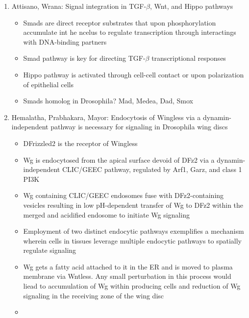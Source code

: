 \documentclass[12pt]{article}
\begin{document}
\begin{enumerate}
\item Attisano, Wrana: Signal integration in TGF-$\beta$, Wnt, and Hippo pathways
\begin{itemize}
	\item Smads are direct receptor substrates that upon phosphorylation accumulate int he ncelus to regulate transcription through interactings with DNA-binding partners
	\item Smad pathway is key for directing TGF-$\beta$ transcriptional responses
	\item Hippo pathway is activated through cell-cell contact or upon polarization of epithelial cells
	\item Smads homolog in Drosophila? Mad, Medea, Dad, Smox 
\end{itemize}

\item Hemalatha, Prabhakara, Mayor: Endocytosis of Wingless via a dynamin-independent pathway is necessary for signaling in Drosophila wing discs
\begin{itemize}
	\item DFrizzled2 is the receptor of Wingless
	\item Wg is endocytosed from the apical surface devoid of DFz2 via a dynamin-independent CLIC/GEEC pathway, regulated by Arf1, Garz, and class 1 PI3K
	\item Wg containing CLIC/GEEC endosomes fuse with DFz2-containing vesicles resulting in low pH-dependent transfer of Wg to DFz2 within the merged and acidified endosome to initiate Wg signaling
	\item Employment of two distinct endocytic pathways exemplifies a mechanism wherein cells in tissues leverage multiple endocytic pathways to spatially regulate signaling
	\item Wg gets a fatty acid attached to it in the ER and is moved to plasma membrane via Wntless. Any small perturbation in this process would liead to accumulation of Wg within producing cells and reduction of Wg signaling in the receiving zone of the wing disc 
	\item  
\end{itemize}
\end{enumerate}
\end{document}
